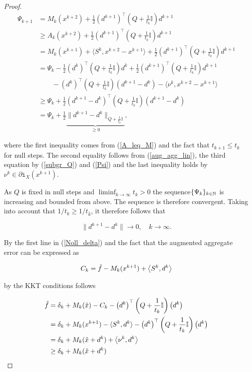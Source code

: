 \begin{proof}
	\begin{align*}
		\Psi_{k+1} &= M_k(x^{k+2})+\frac{1}{2}\left(d^{k+1}\right)^{\top}\left(Q+\frac{1}{t_k}\mathbb{I} \right)d^{k+1} \\
		&\geq A_k(x^{k+2})+\frac{1}{2}\left(d^{k+1}\right)^{\top}\left(Q+\frac{1}{t_k}\mathbb{I}\right)d^{k+1} \\
		&= M_k(x^{k+1})+\langle S^k,x^{k+2}-x^{k+1} \rangle +\frac{1}{2}\left(d^{k+1}\right)^{\top}\left(Q+\frac{1}{t_k}\mathbb{I}\right)d^{k+1} \\
		&= \Psi_k - \frac{1}{2}\left(d^{k}\right)^{\top}\left(Q+\frac{1}{t_k}\mathbb{I}\right)d^{k} + \frac{1}{2}\left(d^{k+1}\right)^{\top}\left(Q+\frac{1}{t_k}\mathbb{I}\right)d^{k+1} \\
		& \qquad -\left(d^{k}\right)^{\top}\left(Q+\frac{1}{t_k}\mathbb{I}\right)\left(d^{k+1} - d^{k}\right) - \langle \nu^k, x^{k+2}-x^{k+1}\rangle\\
		&\geq \Psi_k + \frac{1}{2}\left(d^{k+1}-d^{k}\right)^{\top}\left(Q+\frac{1}{t_k}\mathbb{I}\right)\left(d^{k+1} - d^{k}\right) \\
		& =\Psi_k + \frac{1}{2}\underbrace{\|d^{k+1}-d^k\|_{Q+\frac{ 1}{t_k}\mathbb{I}}}_{\geq 0},
	\end{align*}
	
where the first inequality comes from (\ref{A_leq_M}) and the fact that \(t_{k+1} \leq t_{k}\) for null steps. The second equality follows from (\ref{aug_agg_lin}), the third equation by (\ref{subgr_Q}) and (\ref{Psi}) and the last inequality holds by \(\nu^k \in \partial \mathtt{i}_X(x^{k+1})\).

As \(Q\) is fixed in null steps and  \(\liminf_{k \to \infty} t_k > 0\) the sequence\(\{\Psi_k\}_{k \in \mathbb{N}}\) is increasing and bounded from above. The sequence is therefore convergent.
Taking into account that \(1/t_k \geq 1/t_{\bar{k}}\), it therefore follows that

\begin{equation}
	\|d^{k+1}-d^k\| \to 0, \quad k \to \infty.
\label{d_to_0}
\end{equation}

By the first line in (\ref{Noll_delta}) and the fact that the augmented aggregate error can be expressed as

\begin{equation*}
	C_k = \hat{f}-M_k(x^{k+1})+\left\langle S^k,d^k \right\rangle 
\end{equation*}

by the KKT conditions follows

\begin{align*}
	\hat{f} &= \delta_k+M_k(\hat{x})-C_k-\left(d^{k}\right)^{\top}\left(Q+\frac{1}{t_k}\mathbb{I}\right)\left(d^{k}\right) \\
	&= \delta_k + M_k(x^{k+1})-\langle S^k,d^k \rangle-\left(d^{k}\right)^{\top}\left(Q+\frac{1}{t_k}\mathbb{I}\right)\left(d^{k}\right)  \\
	&= \delta_k + M_k(\hat{x}+d^k)+\left\langle \nu^k, d^k \right\rangle\\
	&\geq \delta_k+M_k(\hat{x}+d^k)
\end{align*}


\end{proof}
